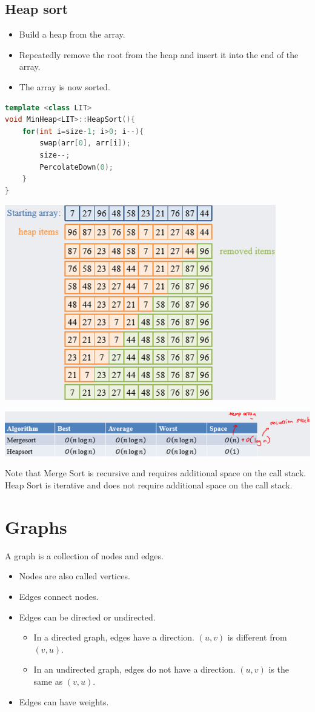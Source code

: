 \documentclass[letterpaper,12pt]{article}
\begin{document}
\subsection{Heap sort}
\begin{itemize}
    \item Build a heap from the array.
    \item Repeatedly remove the root from the heap and insert it into the end of the array.
    \item The array is now sorted.
\end{itemize}
\begin{lstlisting}[language=C++]
template <class LIT>
void MinHeap<LIT>::HeapSort(){
    for(int i=size-1; i>0; i--){
        swap(arr[0], arr[i]);
        size--;
        PercolateDown(0);
    }
}
\end{lstlisting}
\includegraphics*{./Images/Heap Sort example.png}

\includegraphics*[scale = 0.8]{./Images/Heap Sort V.S. Merge Sort.png}

Note that Merge Sort is recursive and requires additional space on the call stack. Heap Sort is iterative and does not require additional space on the call stack.

\section{Graphs}
A graph is a collection of nodes and edges. \begin{itemize}
    \item Nodes are also called vertices.
    \item Edges connect nodes.
    \item Edges can be directed or undirected. \begin{itemize}
        \item In a directed graph, edges have a direction. $(u,v)$ is different from $(v,u)$.
        \item In an undirected graph, edges do not have a direction. $(u,v)$ is the same as $(v,u)$.
    \end{itemize}
    \item Edges can have weights.
\end{itemize}
\end{document}
